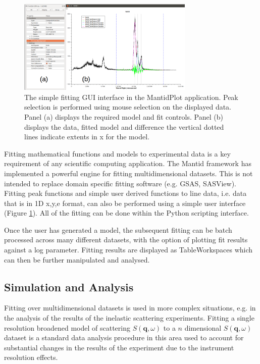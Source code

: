 \documentclass[1p]{elsarticle}
\begin{document}
\begin{figure}[!ht]
\centerline{\includegraphics[width=0.75\textwidth]{Fitting.pdf}}
\caption{The simple fitting GUI interface in the MantidPlot application. Peak selection is performed using mouse selection on the displayed data.
Panel (a) displays the required model and fit controls. Panel (b) displays the data, fitted model and difference the vertical dotted lines indicate extents in x for the model.  }
\label{fig:Fitting}
\end{figure}
Fitting mathematical functions and models to experimental data is a key requirement of any scientific computing application. 
The Mantid framework has implemented a powerful engine for fitting multidimensional datasets. This is not intended to replace domain specific fitting software (e.g. GSAS, SASView). 
 Fitting peak functions and simple user derived functions to line data, i.e. data that is in 1D x,y,e format, can also be performed using a simple user interface (Figure \ref{fig:Fitting}). All of the fitting can be done within the Python scripting  interface.

Once the user has generated a model, the subsequent fitting can be batch processed across many different datasets, with the option of plotting fit results against a log parameter. Fitting results are displayed as TableWorkspaces which can then be further manipulated and analysed.





\subsection {Simulation and Analysis}

Fitting over multidimensional datasets is used in more complex situations, e.g. in the analysis of the results of the inelastic scattering experiments. Fitting a single resolution broadened model of scattering $S(\textbf{q},\omega)$ to a $n$ dimensional $S(\textbf{q},\omega)$ dataset is a standard data analysis procedure in this area used to account for substantial changes in the results of the experiment due to the instrument resolution effects.
 
\end{document}
